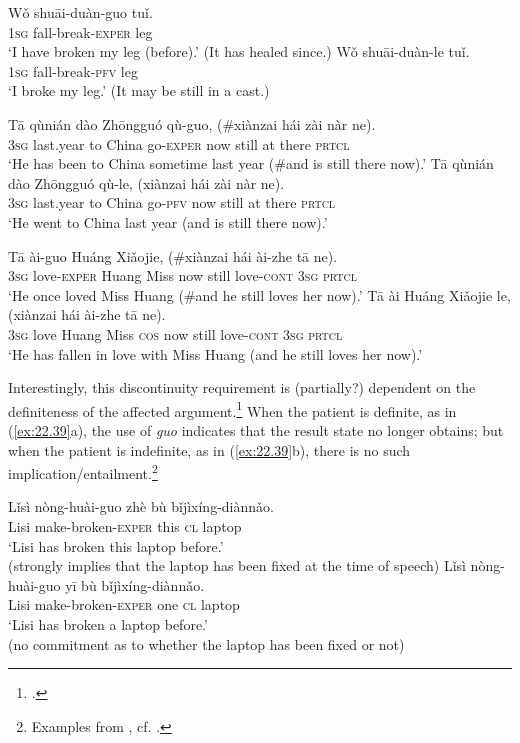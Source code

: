 \ea \label{ex:22.36}
\ea  \gll Wǒ  shuāi-duàn-guo  tuǐ.\\
\textsc{1sg}  fall-break-\textsc{exper}  leg\\
\glt ‘I have broken my leg (before).’ (It has healed since.) 
\ex \gll Wǒ  shuāi-duàn-le  tuǐ.\\
\textsc{1sg}  fall-break-\textsc{pfv}  leg\\
\glt ‘I broke my leg.’  (It may be still in a cast.)  
\z \z

\ea \label{ex:22.37}
\ea \gll Tā  qùnián  dào  Zhōngguó  qù-guo,  (\#xiànzai  hái  zài  nàr  ne).\\
\textsc{3sg}  last.year  to  China  go-\textsc{exper}    now  still  at  there  \textsc{prtcl}\\
\glt ‘He has been to China sometime last year (\#and is still there now).’ 
\ex \gll  Tā  qùnián  dào  Zhōngguó  qù-le,  (xiànzai  hái  zài  nàr  ne).\\
\textsc{3sg}  last.year  to  China  go-\textsc{pfv} now  still  at  there  \textsc{prtcl}\\
\glt ‘He went to China last year (and is still there now).’ 
\z \z

\ea \label{ex:22.38}
\ea \gll  Tā  ài-guo  Huáng  Xiǎojie,  (\#xiànzai  hái  ài-zhe  tā  ne).\\
\textsc{3sg}  love-\textsc{exper}  Huang  Miss now  still  love-\textsc{cont}  \textsc{3sg}  \textsc{prtcl}\\
\glt ‘He once loved Miss Huang (\#and he still loves her now).’ 
\ex \gll  Tā  ài  Huáng  Xiǎojie  le,  (xiànzai  hái  ài-zhe  tā  ne).\\
\textsc{3sg}  love  Huang  Miss \textsc{cos} now  still  love-\textsc{cont}  \textsc{3sg}  \textsc{prtcl}\\
\glt ‘He has fallen in love with Miss Huang (and he still loves her now).’  
\z \z


Interestingly, this discontinuity requirement is (partially?) dependent on the definiteness of the affected argument.\footnote{\citet{Lin2007,Wu2008,Chen2009}.} When the patient is definite, as in (\ref{ex:22.39}a), the use of \textit{guo} indicates that the result state no longer obtains; but when the patient is indefinite, as in (\ref{ex:22.39}b), there is no such implication/entailment.\footnote{Examples from \citet{Chen2009}, cf. \citet{Lin2007}.}


\ea \label{ex:22.39}
\ea  \gll Lǐsì  nòng-huài-guo  zhè  bù  bǐjìxíng-diànnǎo.\\
Lisi  make-broken-\textsc{exper}  this  \textsc{cl}  laptop\\
\glt ‘Lisi has broken this laptop before.’\\
(strongly implies that the laptop has been fixed at the time of speech)
\ex \gll  Lǐsì  nòng-huài-guo  yī  bù  bǐjìxíng-diànnǎo.\\
Lisi  make-broken-\textsc{exper}  one  \textsc{cl}  laptop\\
\glt ‘Lisi has broken a laptop before.’  \\
(no commitment as to whether the laptop has been fixed or not)
\z \z


